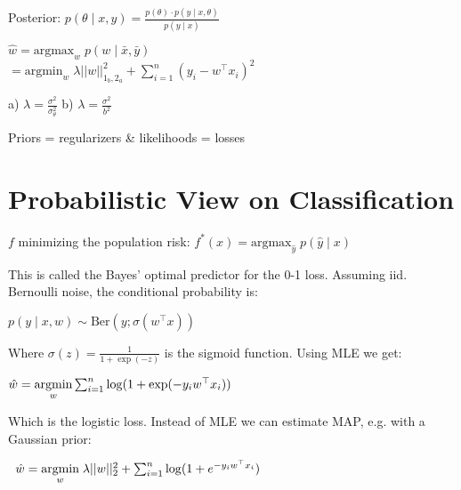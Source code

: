 Posterior: $p(\theta \; | \; x, y) = \frac{p(\theta) \cdot p( y \; | \; x, \theta)}{p( y \; | \; x)}$

$\hat w = \text{argmax}_w \; p(w \; | \; \bar x, \bar y)$ \\[-8pt]

\quad $= \text{argmin}_w \; \lambda ||w||_{1_b, 2_a}^2 + \sum_{i=1}^n(y_i - w^\top x_i)^2$

a) $\lambda = \frac{\sigma^2}{\sigma^2_\theta}$ b) $\lambda = \frac{\sigma^2}{b^2}$

Priors = regularizers \& likelihoods = losses

\section*{Probabilistic View on Classification}

$f$ minimizing the population risk: $f^*(x) = \text{argmax}_{\hat y} \; p(\hat y \; | \; x)$

This is called the Bayes' optimal predictor for the 0-1 loss. Assuming iid. Bernoulli noise, the conditional probability is:

\qquad \qquad$p(y \; | \; x,w) \sim \text{Ber}(y; \sigma(w^\top x))$

Where $\sigma(z) = \frac{1}{1 + \exp(-z)}$ is the sigmoid function. Using MLE we get:

\quad \;$\hat w = \underset{w}{\text{argmin}} \sum_{i = 1}^n \log (1 + \exp(-y_i w^\top x_i))$

Which is the logistic loss. Instead of MLE we can estimate MAP, e.g. with a Gaussian prior:

$\; \;\hat w = \underset{w}{\text{argmin}} \; \lambda ||w||_2^2 + \sum_{i = 1}^n \log (1 + e^{-y_i w^\top x_i})$






